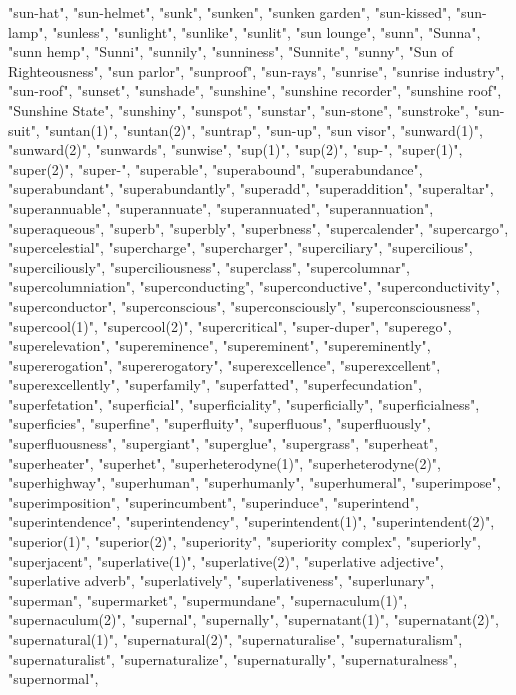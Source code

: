 "sun-hat",
"sun-helmet",
"sunk",
"sunken",
"sunken garden",
"sun-kissed",
"sun-lamp",
"sunless",
"sunlight",
"sunlike",
"sunlit",
"sun lounge",
"sunn",
"Sunna",
"sunn hemp",
"Sunni",
"sunnily",
"sunniness",
"Sunnite",
"sunny",
"Sun of Righteousness",
"sun parlor",
"sunproof",
"sun-rays",
"sunrise",
"sunrise industry",
"sun-roof",
"sunset",
"sunshade",
"sunshine",
"sunshine recorder",
"sunshine roof",
"Sunshine State",
"sunshiny",
"sunspot",
"sunstar",
"sun-stone",
"sunstroke",
"sun-suit",
"suntan(1)",
"suntan(2)",
"suntrap",
"sun-up",
"sun visor",
"sunward(1)",
"sunward(2)",
"sunwards",
"sunwise",
"sup(1)",
"sup(2)",
"sup-",
"super(1)",
"super(2)",
"super-",
"superable",
"superabound",
"superabundance",
"superabundant",
"superabundantly",
"superadd",
"superaddition",
"superaltar",
"superannuable",
"superannuate",
"superannuated",
"superannuation",
"superaqueous",
"superb",
"superbly",
"superbness",
"supercalender",
"supercargo",
"supercelestial",
"supercharge",
"supercharger",
"superciliary",
"supercilious",
"superciliously",
"superciliousness",
"superclass",
"supercolumnar",
"supercolumniation",
"superconducting",
"superconductive",
"superconductivity",
"superconductor",
"superconscious",
"superconsciously",
"superconsciousness",
"supercool(1)",
"supercool(2)",
"supercritical",
"super-duper",
"superego",
"superelevation",
"supereminence",
"supereminent",
"supereminently",
"supererogation",
"supererogatory",
"superexcellence",
"superexcellent",
"superexcellently",
"superfamily",
"superfatted",
"superfecundation",
"superfetation",
"superficial",
"superficiality",
"superficially",
"superficialness",
"superficies",
"superfine",
"superfluity",
"superfluous",
"superfluously",
"superfluousness",
"supergiant",
"superglue",
"supergrass",
"superheat",
"superheater",
"superhet",
"superheterodyne(1)",
"superheterodyne(2)",
"superhighway",
"superhuman",
"superhumanly",
"superhumeral",
"superimpose",
"superimposition",
"superincumbent",
"superinduce",
"superintend",
"superintendence",
"superintendency",
"superintendent(1)",
"superintendent(2)",
"superior(1)",
"superior(2)",
"superiority",
"superiority complex",
"superiorly",
"superjacent",
"superlative(1)",
"superlative(2)",
"superlative adjective",
"superlative adverb",
"superlatively",
"superlativeness",
"superlunary",
"superman",
"supermarket",
"supermundane",
"supernaculum(1)",
"supernaculum(2)",
"supernal",
"supernally",
"supernatant(1)",
"supernatant(2)",
"supernatural(1)",
"supernatural(2)",
"supernaturalise",
"supernaturalism",
"supernaturalist",
"supernaturalize",
"supernaturally",
"supernaturalness",
"supernormal",
